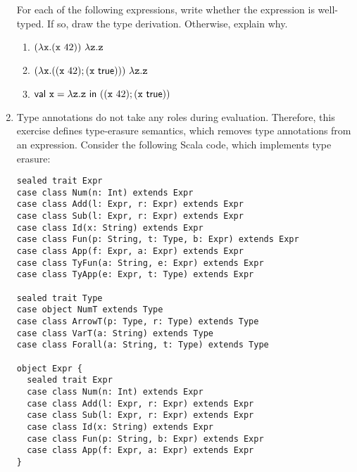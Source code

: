 \begin{enumerate}
For each of the following expressions, write whether the expression is
well-typed. If so, draw the type derivation. Otherwise, explain why.
\begin{enumerate}
  \item $(\lambda \code{x}.(\code{x}\ 42))\ \lambda \code{z}.\code{z}$
  \item $(\lambda \texttt{x}.((\texttt{x}\ 42); (\texttt{x}\ \textsf{true})))\ \lambda \texttt{z}.\texttt{z}$
  \item $\textsf{val}\ \code{x}=\lambda \code{z}.\code{z}\ \textsf{in}\ ((\code{x}\ 42); (\code{x}\ \textsf{true}))$
\end{enumerate}

\item Type annotations do not take any roles during evaluation.
Therefore, this exercise defines type-erasure semantics, which removes
type annotations from an expression.
Consider the following Scala code, which implements type erasure:
\begin{verbatim}
sealed trait Expr
case class Num(n: Int) extends Expr
case class Add(l: Expr, r: Expr) extends Expr
case class Sub(l: Expr, r: Expr) extends Expr
case class Id(x: String) extends Expr
case class Fun(p: String, t: Type, b: Expr) extends Expr
case class App(f: Expr, a: Expr) extends Expr
case class TyFun(a: String, e: Expr) extends Expr
case class TyApp(e: Expr, t: Type) extends Expr

sealed trait Type
case object NumT extends Type
case class ArrowT(p: Type, r: Type) extends Type
case class VarT(a: String) extends Type
case class Forall(a: String, t: Type) extends Type

object Expr {
  sealed trait Expr
  case class Num(n: Int) extends Expr
  case class Add(l: Expr, r: Expr) extends Expr
  case class Sub(l: Expr, r: Expr) extends Expr
  case class Id(x: String) extends Expr
  case class Fun(p: String, b: Expr) extends Expr
  case class App(f: Expr, a: Expr) extends Expr
}


\end{verbatim}
\end{enumerate}
